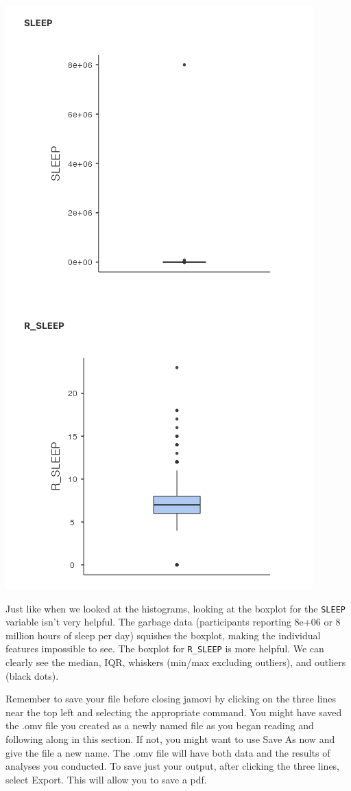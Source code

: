 \documentclass[
]{book}
\begin{document}
\includegraphics{img/sleepboxplots.png}

Just like when we looked at the histograms, looking at the boxplot for the \texttt{SLEEP} variable isn't very helpful. The garbage data (participants reporting 8e+06 or 8 million hours of sleep per day) squishes the boxplot, making the individual features impossible to see. The boxplot for \texttt{R\_SLEEP} is more helpful. We can clearly see the median, IQR, whiskers (min/max excluding outliers), and outliers (black dots).

Remember to save your file before closing jamovi by clicking on the three lines near the top left and selecting the appropriate command. You might have saved the .omv file you created as a newly named file as you began reading and following along in this section. If not, you might want to use {Save As} now and give the file a new name. The .omv file will have both data and the results of analyses you conducted. To save just your output, after clicking the three lines, select {Export}. This will allow you to save a pdf.
\end{document}
